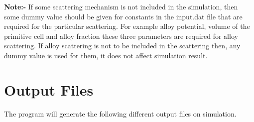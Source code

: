 \documentclass[12pt]{article}
\begin{document}
\begin{enumerate}
\begin{enumerate}[label=\Roman*]
\end{enumerate}
\textbf{Note:-} If some scattering mechanism is not included in the simulation, then some dummy value should be given for constants in the input.dat file that are required for the particular scattering. For example alloy potential, volume of the primitive cell and alloy fraction these three parameters are required for alloy scattering. If alloy scattering is not to be included in the scattering then, any dummy value is used for them, it does not affect simulation result.
\end{enumerate}
   
\section{Output Files} 
The program will generate the following different output files on simulation.
\end{document}
